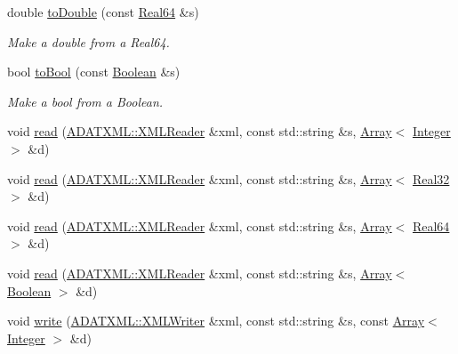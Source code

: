 \begin{DoxyCompactItemize}
double \mbox{\hyperlink{namespaceENSEM_ac48f5951452a687d3b08acfd4b10d874}{to\+Double}} (const \mbox{\hyperlink{group__defs_gaae0bff35c031375b1ffeb693402496c8}{Real64}} \&s)
\begin{DoxyCompactList}\small\item\em Make a double from a Real64. \end{DoxyCompactList}\item 
bool \mbox{\hyperlink{namespaceENSEM_abc04e0e08f1aeecdaca3de8b916ac697}{to\+Bool}} (const \mbox{\hyperlink{group__defs_ga38f0cd64d26e121e75367986f2d7cd6c}{Boolean}} \&s)
\begin{DoxyCompactList}\small\item\em Make a bool from a Boolean. \end{DoxyCompactList}\item 
void \mbox{\hyperlink{namespaceENSEM_a59df78af1e673ccefd2496b40ffcebac}{read}} (\mbox{\hyperlink{classADATXML_1_1XMLReader}{A\+D\+A\+T\+X\+M\+L\+::\+X\+M\+L\+Reader}} \&xml, const std\+::string \&s, \mbox{\hyperlink{classXMLArray_1_1Array}{Array}}$<$ \mbox{\hyperlink{group__defs_gab13d060149cdd80ab40fd8d653f60117}{Integer}} $>$ \&d)
\item 
void \mbox{\hyperlink{namespaceENSEM_a35ede464f1c4210bc6236f281a40ee73}{read}} (\mbox{\hyperlink{classADATXML_1_1XMLReader}{A\+D\+A\+T\+X\+M\+L\+::\+X\+M\+L\+Reader}} \&xml, const std\+::string \&s, \mbox{\hyperlink{classXMLArray_1_1Array}{Array}}$<$ \mbox{\hyperlink{group__defs_gab601f1c55eb75baed0a0859b3fec6bc1}{Real32}} $>$ \&d)
\item 
void \mbox{\hyperlink{namespaceENSEM_ae92990139593325dd95e78b0bc6aa89d}{read}} (\mbox{\hyperlink{classADATXML_1_1XMLReader}{A\+D\+A\+T\+X\+M\+L\+::\+X\+M\+L\+Reader}} \&xml, const std\+::string \&s, \mbox{\hyperlink{classXMLArray_1_1Array}{Array}}$<$ \mbox{\hyperlink{group__defs_gaae0bff35c031375b1ffeb693402496c8}{Real64}} $>$ \&d)
\item 
void \mbox{\hyperlink{namespaceENSEM_a13be7bdc8993a65ff255f214db955c16}{read}} (\mbox{\hyperlink{classADATXML_1_1XMLReader}{A\+D\+A\+T\+X\+M\+L\+::\+X\+M\+L\+Reader}} \&xml, const std\+::string \&s, \mbox{\hyperlink{classXMLArray_1_1Array}{Array}}$<$ \mbox{\hyperlink{group__defs_ga38f0cd64d26e121e75367986f2d7cd6c}{Boolean}} $>$ \&d)
\item 
void \mbox{\hyperlink{namespaceENSEM_a1e0e32b9a435ad75c6308eed3fbccdb9}{write}} (\mbox{\hyperlink{classADATXML_1_1XMLWriter}{A\+D\+A\+T\+X\+M\+L\+::\+X\+M\+L\+Writer}} \&xml, const std\+::string \&s, const \mbox{\hyperlink{classXMLArray_1_1Array}{Array}}$<$ \mbox{\hyperlink{group__defs_gab13d060149cdd80ab40fd8d653f60117}{Integer}} $>$ \&d)

\end{DoxyCompactItemize}
